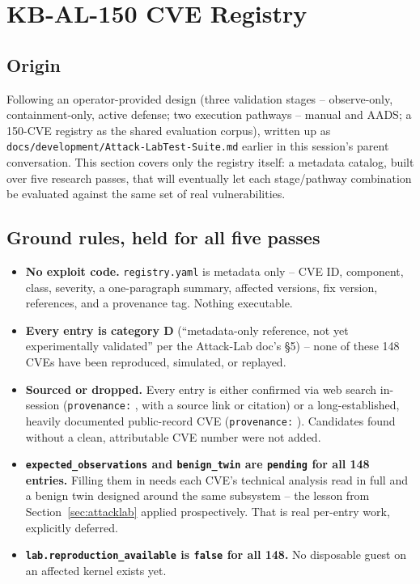 \documentclass[11pt,a4paper]{article}
\begin{document}
\clearpage

\section{KB-AL-150 CVE Registry}
\label{sec:cve}

\subsection*{Origin}
Following an operator-provided design (three validation stages --
observe-only, containment-only, active defense; two execution pathways --
manual and AADS; a 150-CVE registry as the shared evaluation corpus),
written up as \texttt{docs/development/Attack-LabTest-Suite.md} earlier
in this session's parent conversation. This section covers only the
registry itself: a metadata catalog, built over five research passes,
that will eventually let each stage/pathway combination be evaluated
against the same set of real vulnerabilities.

\subsection*{Ground rules, held for all five passes}
\begin{itemize}
\item \textbf{No exploit code.} \texttt{registry.yaml} is metadata only --
  CVE ID, component, class, severity, a one-paragraph summary, affected
  versions, fix version, references, and a provenance tag. Nothing
  executable.
\item \textbf{Every entry is category D} (``metadata-only reference, not
  yet experimentally validated'' per the Attack-Lab doc's \S5) -- none of
  these 148 CVEs have been reproduced, simulated, or replayed.
\item \textbf{Sourced or dropped.} Every entry is either confirmed via web
  search in-session (\texttt{provenance:}
  , with a source link or
  citation) or a long-established, heavily documented public-record CVE
  (\texttt{provenance:} ).
  Candidates found without a clean, attributable CVE number were not
  added.
\item \textbf{\texttt{expected\_observations} and \texttt{benign\_twin}
  are \texttt{pending} for all 148 entries.} Filling them in needs each
  CVE's technical analysis read in full and a benign twin designed
  around the same subsystem -- the lesson from
  Section~\ref{sec:attacklab} applied prospectively. That is real
  per-entry work, explicitly deferred.
\item \textbf{\texttt{lab.reproduction\_available} is \texttt{false}
  for all 148.} No disposable guest on an affected kernel exists yet.
\end{itemize}
\end{document}
